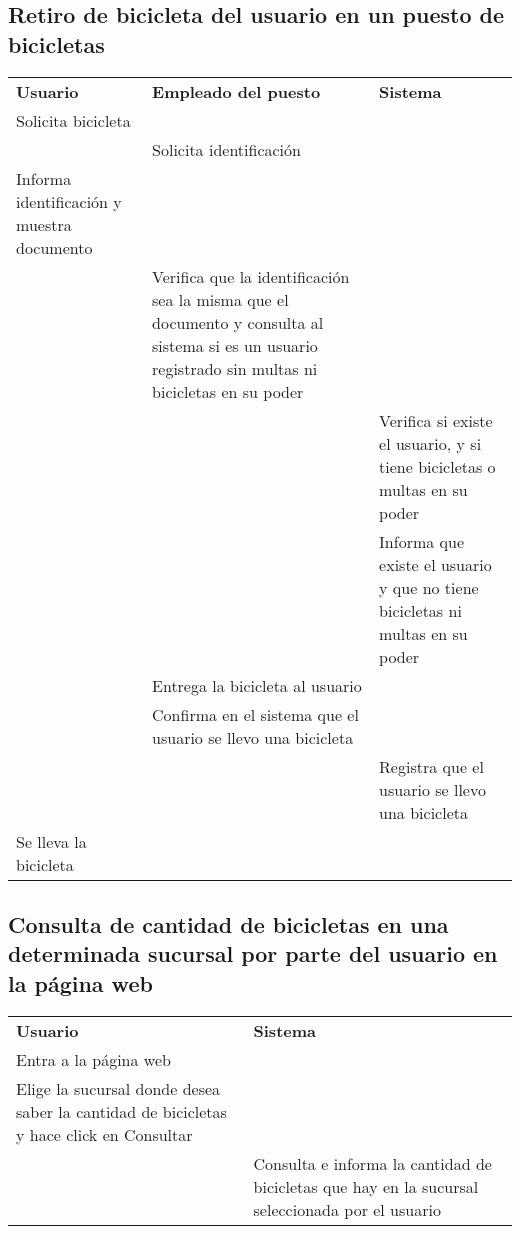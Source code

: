\documentclass[a4paper, 11pt, spanish]{article}
\begin{document}
\endgroup

\subsection{Retiro de bicicleta del usuario en un puesto de bicicletas}

\begingroup
    \fontsize{8pt}{12pt}\selectfont

\begin{tabular}{|p{5cm}|p{5cm}|p{5cm}|}
\cline{1-3}
\textbf{Usuario} & \textbf{Empleado del puesto} & \textbf{Sistema} \\ \cline{1-3}
Solicita bicicleta & &\\ \cline{1-3}
 & Solicita identificación &    \\ \cline{1-3}
Informa identificación y muestra documento & & \\ \cline{1-3}
 & Verifica que la identificación sea la misma que el documento y consulta al sistema si es un usuario registrado sin multas ni bicicletas en su poder & \\ \cline{1-3}
 & & Verifica si existe el usuario, y si tiene bicicletas o multas en su poder \\ \cline{1-3}
 & & Informa que existe el usuario y que no tiene bicicletas ni multas en su poder \\ \cline{1-3}
 & Entrega la bicicleta al usuario &    \\ \cline{1-3}
 & Confirma en el sistema que el usuario se llevo una bicicleta &    \\ \cline{1-3}
 &  & Registra que el usuario se llevo una bicicleta \\ \cline{1-3}
Se lleva la bicicleta & &    \\ \cline{1-3}
\end{tabular}

\endgroup

\subsection{Consulta de cantidad de bicicletas en una determinada sucursal por parte del usuario en la página web}

\begingroup
    \fontsize{8pt}{12pt}\selectfont

\begin{tabular}{|p{7cm}|p{7cm}|}
\cline{1-2}
\textbf{Usuario} & \textbf{Sistema} \\ \cline{1-2}
Entra a la página web & \\ \cline{1-2}
Elige la sucursal donde desea saber la cantidad de bicicletas y hace click en Consultar& \\ \cline{1-2}
 &Consulta e informa la cantidad de bicicletas que hay en la sucursal seleccionada por el usuario \\ \cline{1-2}
\end{tabular}
\end{document}
